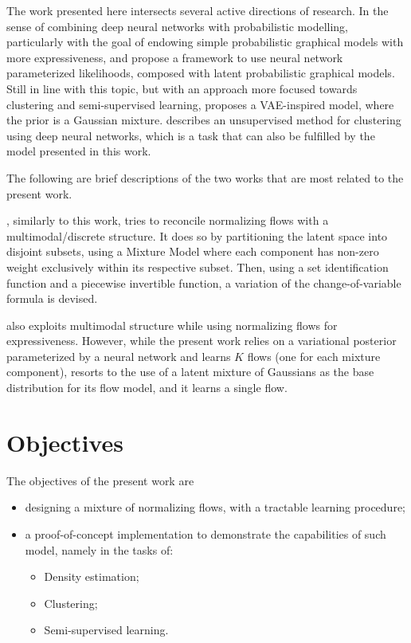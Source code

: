 The work presented here intersects several active directions of research.
In the sense of combining deep neural networks with probabilistic modelling,
particularly with the goal of endowing simple probabilistic graphical models
with more expressiveness, \autocite{svae} and \autocite{lin2018variational} propose a
framework to use neural network parameterized likelihoods, composed with latent
probabilistic graphical models. Still in line with this topic, but with an
approach more focused towards clustering and semi-supervised learning, \autocite{gmVAE}
proposes a VAE-inspired model, where the prior is a Gaussian mixture. \autocite{DEC}
describes an unsupervised method for clustering using deep neural networks, which
is a task that can also be fulfilled by the model presented in this work.

The following are brief descriptions of the two works that are most related to
the present work.

\autocite{RAD}, similarly to this work, tries to reconcile normalizing flows with a
multimodal/discrete structure. It does so by partitioning the latent space into
disjoint subsets, using a Mixture Model where each component has non-zero
weight exclusively within its respective subset. Then, using a set identification
function and a piecewise invertible function, a variation of the change-of-variable
formula is devised.

\autocite{semisuplearning_nflows} also exploits multimodal structure while
using normalizing flows for expressiveness. However, while the present work relies on
a variational posterior parameterized by a neural network and learns $K$ flows
(one for each mixture component), \autocite{semisuplearning_nflows} resorts to the use of a
latent mixture of Gaussians as the base distribution for its flow model, and it
learns a single flow.

\section{Objectives}
\label{section:objectives}

The objectives of the present work are
\begin{itemize}
    \item designing a mixture of normalizing flows, with a tractable learning procedure;
    \item a proof-of-concept implementation to demonstrate the capabilities of such model, namely in the tasks of:
        \begin{itemize}
        \item Density estimation;
        \item Clustering;
        \item Semi-supervised learning.
        \end{itemize}
\end{itemize}


